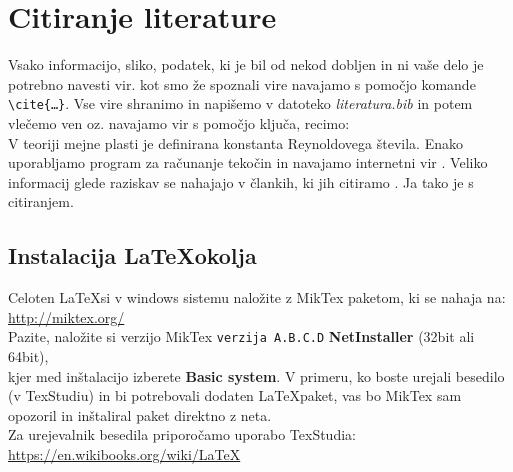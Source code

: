 \documentclass[11pt,a4]{article}
\begin{document}
\section{Citiranje literature}
Vsako informacijo, sliko, podatek, ki je bil od nekod dobljen in ni vaše delo je potrebno navesti vir. kot smo že spoznali vire navajamo s pomočjo komande \texttt{\textbackslash cite\{\ldots\}}. Vse vire shranimo in napišemo v datoteko \textit{literatura.bib} in potem vlečemo ven oz. navajamo vir s pomočjo ključa, recimo:\\
V teoriji mejne plasti \cite{boundary_layer_theory} je definirana konstanta Reynoldovega števila. Enako uporabljamo program za računanje tekočin \cite{openfoam} in navajamo internetni vir \cite{cfd_online_skin_friction}. Veliko informacij glede raziskav se nahajajo v člankih, ki jih citiramo \cite{bird_et_all}. Ja tako je s citiranjem.

\subsection{Instalacija \LaTeX okolja}
Celoten \LaTeX si v windows sistemu naložite z MikTex paketom, ki se nahaja na:\\[0.2cm]
\url{http://miktex.org/}\\[0.2cm]
Pazite, naložite si verzijo MikTex \texttt{verzija A.B.C.D} \textbf{NetInstaller} (32bit ali 64bit),\\[0.2cm]
kjer med inštalacijo izberete \textbf{Basic system}. V primeru, ko boste urejali besedilo (v TexStudiu) in bi potrebovali dodaten \LaTeX paket, vas bo MikTex sam opozoril in inštaliral paket direktno z neta.\\[0.5cm]

Za urejevalnik besedila priporočamo uporabo TexStudia:\\[0.2cm]
\url{https://en.wikibooks.org/wiki/LaTeX}


\newpage

%

\end{document}
